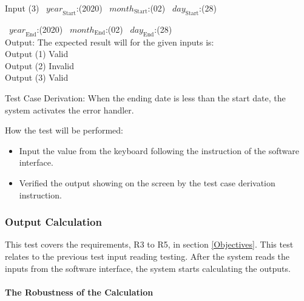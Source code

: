 \documentclass[12pt, titlepage]{article}
\begin{document}
\begin{enumerate}
Input (3) ~$\mathit{year}_\text{Start}$:(2020)
~$\mathit{month}_\text{Start}$:(02) ~$\mathit{day}_\text{Start}$:(28)

~$\mathit{year}_\text{End}$:(2020)
~$\mathit{month}_\text{End}$:(02) ~$\mathit{day}_\text{End}$:(28)\\

Output: The expected result will for the given inputs is:\\ 
Output (1) Valid\\ 
Output (2) Invalid\\
Output (3) Valid\\ 


Test Case Derivation: When the ending date is less than the start date, the system
activates the error handler. \\



How the test will be performed: 

\begin{itemize} 
\item Input the value from the keyboard following the instruction of the
software interface. 
\item Verified the output showing on the screen by the test case derivation
instruction.
\end{itemize} 
\end{enumerate}

\subsubsection{Output Calculation}

This test covers the requirements, R3 to R5, in section \ref{Objectives}.
This test relates to the previous test input reading testing. After the 
system reads the inputs from the software interface, the system starts
calculating the outputs.



\paragraph{The Robustness of the Calculation}
\end{document}
